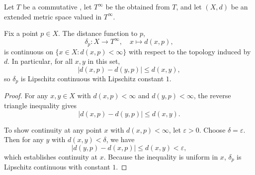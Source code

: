 \begin{proposition}
\label{proposition:distance_function_to_a_fixed_point_in_an_extended_metric_space_valued_in_a_commutative_ordered_semiring_is_continuous}
Let $T$ be a commutative , let $T^\infty$ be the  obtained from $T$, and let $(X, d)$ be an extended metric space valued in $T^\infty$.

Fix a point $p \in X$. The distance function to $p$,
$$\delta_p : X \to T^\infty, \quad x \mapsto d(x, p),$$
is continuous on $\{x \in X : d(x, p) < \infty\}$ with respect to the topology induced by $d$. In particular, for all $x, y$ in this set,
$$|d(x, p) - d(y, p)| \leq d(x, y),$$
so $\delta_p$ is Lipschitz continuous with Lipschitz constant $1$.
\end{proposition}

\begin{proof}
For any $x, y \in X$ with $d(x, p) < \infty$ and $d(y, p) < \infty$, the reverse triangle inequality gives
$$|d(x, p) - d(y, p)| \leq d(x, y).$$

To show continuity at any point $x$ with $d(x, p) < \infty$, let $\varepsilon > 0$. Choose $\delta = \varepsilon$. Then for any $y$ with $d(x, y) < \delta$, we have
$$|d(y, p) - d(x, p)| \leq d(x, y) < \varepsilon,$$
which establishes continuity at $x$. Because the inequality is uniform in $x$, $\delta_p$ is Lipschitz continuous with constant $1$.
\end{proof}
